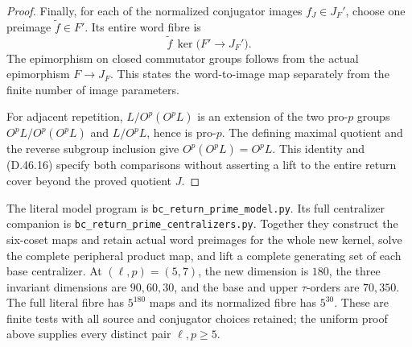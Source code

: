 \begin{proof}
Finally, for each of the normalized conjugator images
\(f_J\in J_F'\), choose one preimage
\(\widetilde f\in F'\). Its entire word fibre is
\[
       \widetilde f\,
         \ker\bigl(F'\longrightarrow J_F'\bigr).
 \tag{D.46.17}
\]
The epimorphism on closed commutator groups follows from
the actual epimorphism \(F\to J_F\).
This states the word-to-image map separately from the
finite number of image parameters.

For adjacent repetition, \(L/O^p(O^pL)\) is an
extension of the two pro-\(p\) groups
\(O^pL/O^p(O^pL)\) and \(L/O^pL\), hence is
pro-\(p\). The defining maximal quotient and the
reverse subgroup inclusion give
\(O^p(O^pL)=O^pL\).
This identity and \textup{(D.46.16)} specify both
comparisons without asserting a lift to the entire
return cover beyond the proved quotient \(J\).
\end{proof}

The literal model program is
\texttt{bc\_return\_prime\_model.py}.
Its full centralizer companion is
\texttt{bc\_return\_prime\_centralizers.py}.
Together they construct the six-coset maps and retain actual word
preimages for the whole new kernel, solve the complete
peripheral product map, and lift a complete generating
set of each base centralizer. At \((\ell,p)=(5,7)\),
the new dimension is \(180\), the three invariant
dimensions are \(90,60,30\), and the base and upper
\(\tau\)-orders are \(70,350\). The full literal
fibre has \(5^{180}\) maps and its normalized fibre
has \(5^{30}\). These are finite tests with all source
and conjugator choices retained; the uniform proof
above supplies every distinct pair \(\ell,p\geq5\).
